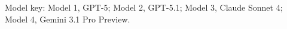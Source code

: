 \documentclass[10pt,a4paper]{article}
\begin{document}

\vspace{3mm}
{\scriptsize\color{Muted}Model key: Model 1, GPT-5; Model 2, GPT-5.1; Model 3, Claude Sonnet 4; Model 4, Gemini 3.1 Pro Preview.}
\end{document}
